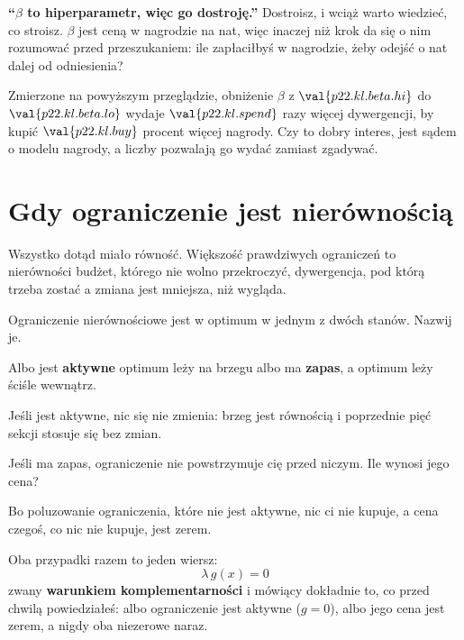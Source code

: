 \begin{fr}
\begin{trapbox}
\textbf{\enquote{$\beta$ to hiperparametr, więc go dostroję.}} Dostroisz, i
wciąż warto wiedzieć, co stroisz. $\beta$ jest ceną w nagrodzie na nat, więc
\dash{} inaczej niż krok \dash{} da się o nim rozumować przed przeszukaniem: ile
zapłaciłbyś w nagrodzie, żeby odejść o nat dalej od odniesienia?

Zmierzone na powyższym przeglądzie, obniżenie $\beta$ z
$\val{p22.kl.beta.hi}$ do $\val{p22.kl.beta.lo}$ wydaje $\val{p22.kl.spend}$
razy więcej dywergencji, by kupić $\val{p22.kl.buy}$ procent więcej nagrody.
Czy to dobry interes, jest sądem o modelu nagrody, a liczby pozwalają go wydać
zamiast zgadywać.
\end{trapbox}
\end{fr}

\section{Gdy ograniczenie jest nierównością}
\label{sec:P22-kkt}

\begin{fr}
Wszystko dotąd miało równość. Większość prawdziwych ograniczeń to nierówności
\dash{} budżet, którego nie wolno przekroczyć, dywergencja, pod którą trzeba
zostać \dash{} a zmiana jest mniejsza, niż wygląda.

Ograniczenie nierównościowe jest w optimum w jednym z dwóch stanów. Nazwij je.
\dotline
\nextframe
\end{fr}

\begin{fr}
\begin{ansblock}
Albo jest \textbf{aktywne} \dash{} optimum leży na brzegu \dash{} albo ma
\textbf{zapas}, a optimum leży ściśle wewnątrz.
\end{ansblock}

Jeśli jest aktywne, nic się nie zmienia: brzeg jest równością i poprzednie pięć
sekcji stosuje się bez zmian.

Jeśli ma zapas, ograniczenie nie powstrzymuje cię przed niczym. Ile wynosi jego
cena?
\nextframe
\end{fr}

\begin{fr}
Bo poluzowanie ograniczenia, które nie jest aktywne, nic ci nie kupuje, a cena
czegoś, co nic nie kupuje, jest zerem.

Oba przypadki razem to jeden wiersz:
\[ \lambda \, g(x) = 0 \]
zwany \textbf{warunkiem komplementarności} i mówiący dokładnie to, co przed
chwilą powiedziałeś: albo ograniczenie jest aktywne ($g = 0$), albo jego cena
jest zerem, a nigdy oba niezerowe naraz.
\end{fr}

